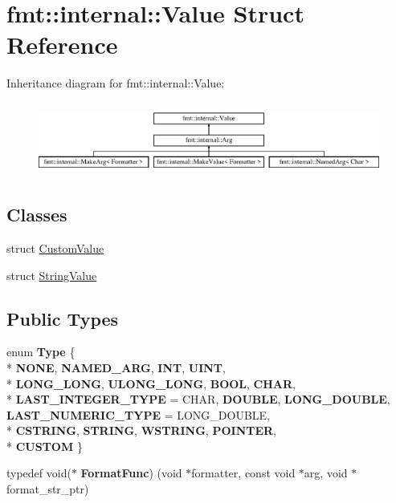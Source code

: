 \hypertarget{structfmt_1_1internal_1_1Value}{}\section{fmt\+:\+:internal\+:\+:Value Struct Reference}
\label{structfmt_1_1internal_1_1Value}
Inheritance diagram for fmt\+:\+:internal\+:\+:Value\+:\begin{figure}[H]
\begin{center}
\leavevmode
\includegraphics[height=2.413793cm]{structfmt_1_1internal_1_1Value}
\end{center}
\end{figure}
\subsection*{Classes}
\begin{DoxyCompactItemize}
\item 
struct \hyperlink{structfmt_1_1internal_1_1Value_1_1CustomValue}{Custom\+Value}
\item 
struct \hyperlink{structfmt_1_1internal_1_1Value_1_1StringValue}{String\+Value}
\end{DoxyCompactItemize}
\subsection*{Public Types}
\begin{DoxyCompactItemize}
\item 
enum {\bfseries Type} \{ \\*
{\bfseries N\+O\+NE}, 
{\bfseries N\+A\+M\+E\+D\+\_\+\+A\+RG}, 
{\bfseries I\+NT}, 
{\bfseries U\+I\+NT}, 
\\*
{\bfseries L\+O\+N\+G\+\_\+\+L\+O\+NG}, 
{\bfseries U\+L\+O\+N\+G\+\_\+\+L\+O\+NG}, 
{\bfseries B\+O\+OL}, 
{\bfseries C\+H\+AR}, 
\\*
{\bfseries L\+A\+S\+T\+\_\+\+I\+N\+T\+E\+G\+E\+R\+\_\+\+T\+Y\+PE} = C\+H\+AR, 
{\bfseries D\+O\+U\+B\+LE}, 
{\bfseries L\+O\+N\+G\+\_\+\+D\+O\+U\+B\+LE}, 
{\bfseries L\+A\+S\+T\+\_\+\+N\+U\+M\+E\+R\+I\+C\+\_\+\+T\+Y\+PE} = L\+O\+N\+G\+\_\+\+D\+O\+U\+B\+LE, 
\\*
{\bfseries C\+S\+T\+R\+I\+NG}, 
{\bfseries S\+T\+R\+I\+NG}, 
{\bfseries W\+S\+T\+R\+I\+NG}, 
{\bfseries P\+O\+I\+N\+T\+ER}, 
\\*
{\bfseries C\+U\+S\+T\+OM}
 \}\hypertarget{structfmt_1_1internal_1_1Value_a0305339d0a9571e14e26f385367fedaa}{}\label{structfmt_1_1internal_1_1Value_a0305339d0a9571e14e26f385367fedaa}

\item 
typedef void($\ast$ {\bfseries Format\+Func}) (void $\ast$formatter, const void $\ast$arg, void $\ast$format\+\_\+str\+\_\+ptr)\hypertarget{structfmt_1_1internal_1_1Value_a1bdc8aa6f70614fbb514aaa56106c669}{}\label{structfmt_1_1internal_1_1Value_a1bdc8aa6f70614fbb514aaa56106c669}

\end{DoxyCompactItemize}
